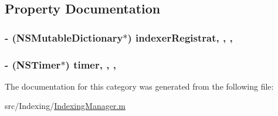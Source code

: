 \subsection{Property Documentation}
\hypertarget{category_indexing_manager_07_08_a9a3484f0fcbdee9b2555cece4280811b}{
\subsubsection[{indexer\-Registrat}]{\setlength{\rightskip}{0pt plus 5cm}-\/ (N\-S\-Mutable\-Dictionary$\ast$) indexer\-Registrat\hspace{0.3cm}{\ttfamily [read]}, {\ttfamily [write]}, {\ttfamily [atomic]}, {\ttfamily [retain]}}}\label{category_indexing_manager_07_08_a9a3484f0fcbdee9b2555cece4280811b}
\hypertarget{category_indexing_manager_07_08_a49efd1a3e05e38497c176a4e11fdbaab}{
\subsubsection[{timer}]{\setlength{\rightskip}{0pt plus 5cm}-\/ (N\-S\-Timer$\ast$) timer\hspace{0.3cm}{\ttfamily [read]}, {\ttfamily [write]}, {\ttfamily [atomic]}, {\ttfamily [retain]}}}\label{category_indexing_manager_07_08_a49efd1a3e05e38497c176a4e11fdbaab}


The documentation for this category was generated from the following file\-:\begin{DoxyCompactItemize}
\item 
src/\-Indexing/\hyperlink{_indexing_manager_8m}{Indexing\-Manager.\-m}\end{DoxyCompactItemize}

